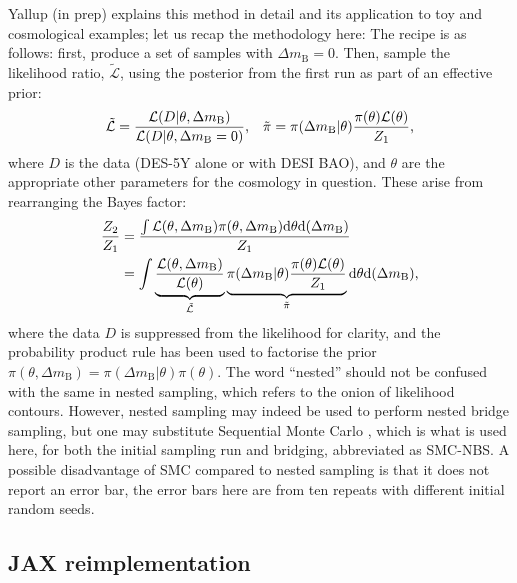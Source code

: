 \documentclass[fleqn,usenatbib]{mnras}
\newcommand{\dmb}{\ensuremath{\Delta m_\mathrm B}}
\begin{document}
    Yallup (in prep) explains this method in detail and its application to toy and cosmological examples; let us recap the methodology here:
    The recipe is as follows: first, produce a set of samples with $\dmb{}=0$.
    Then, sample the likelihood ratio, $\tilde{\mathcal L}$, using the posterior from the first run as part of an effective prior:
    \begin{equation}
        \tilde{\mathcal L}=\frac{\mathcal L(D|\theta, \dmb{})}{\mathcal L(D|\theta, \dmb{}=0)}\text, \quad 
        \tilde\pi = \pi(\dmb{}|\theta)\frac{\pi(\theta)\mathcal L(\theta)}{Z_1}\text,
        \label{eq:ratio}
    \end{equation}
    where $D$ is the data (DES-5Y alone or with DESI BAO), and $\theta$ are the appropriate other parameters for the cosmology in question.
    These arise from rearranging the Bayes factor:
    \begin{equation} \label{eq:ratioratio}
        \begin{aligned}
            \frac{Z_2}{Z_1} &= \frac{\int\mathcal L(\theta, \dmb{})\pi(\theta, \dmb{})\mathrm d\theta\mathrm d(\dmb{})}{Z_1} \\
            &= \int\underbrace{\frac{\mathcal L(\theta, \dmb{})}{\mathcal L(\theta)}}_{\tilde{\mathcal L}}
            \underbrace{\pi(\dmb{}|\theta)\frac{\pi(\theta)\mathcal L(\theta)}{Z_1}}_{\tilde\pi} \mathrm d\theta\mathrm d(\dmb{}) \text,
        \end{aligned}
    \end{equation}
    where the data $D$ is suppressed from the likelihood for clarity, and the probability product rule has been used to factorise the prior $\pi(\theta, \dmb{}) = \pi(\dmb{}|\theta)\pi(\theta)$.
    The word ``nested'' should not be confused with the same in nested sampling, which refers to the onion of likelihood contours.
    However, nested sampling may indeed be used to perform nested bridge sampling, but one may substitute Sequential Monte Carlo \citep{smc}, which is what is used here, for both the initial sampling run and bridging, abbreviated as SMC-NBS.
    A possible disadvantage of SMC compared to nested sampling is that it does not report an error bar, the error bars here are from ten repeats with different initial random seeds.

    \subsection{\textsc{JAX} reimplementation}
\end{document}
